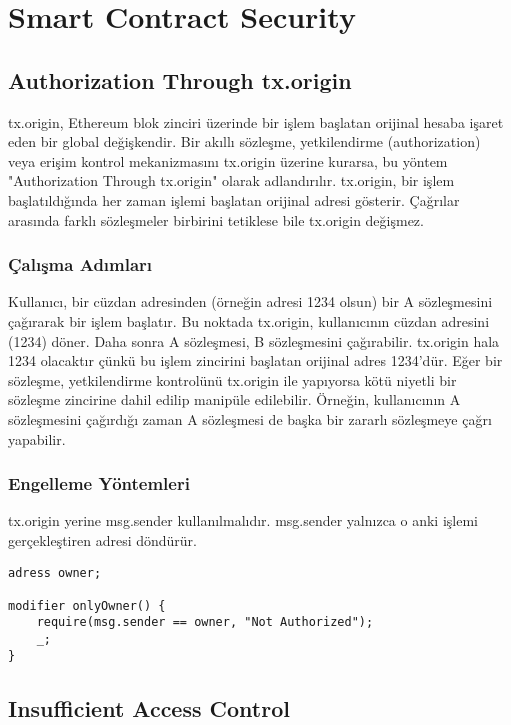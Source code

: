 \section{Smart Contract Security}

\subsection{Authorization Through tx.origin}

tx.origin, Ethereum blok zinciri üzerinde bir işlem başlatan orijinal hesaba işaret eden bir global değişkendir. Bir akıllı sözleşme, yetkilendirme (authorization) veya erişim kontrol mekanizmasını tx.origin üzerine kurarsa, bu yöntem "Authorization Through tx.origin" olarak adlandırılır.  tx.origin, bir işlem başlatıldığında her zaman işlemi başlatan orijinal adresi gösterir. Çağrılar arasında farklı sözleşmeler birbirini tetiklese bile tx.origin değişmez.

\subsubsection{Çalışma Adımları}

Kullanıcı, bir cüzdan adresinden (örneğin adresi 1234 olsun) bir A sözleşmesini çağırarak bir işlem başlatır. Bu noktada tx.origin, kullanıcının cüzdan adresini (1234) döner. Daha sonra A sözleşmesi, B sözleşmesini çağırabilir. tx.origin hala 1234 olacaktır çünkü bu işlem zincirini başlatan orijinal adres 1234'dür. Eğer bir sözleşme, yetkilendirme kontrolünü tx.origin ile yapıyorsa kötü niyetli bir sözleşme zincirine dahil edilip manipüle edilebilir. Örneğin, kullanıcının A sözleşmesini çağırdığı zaman A sözleşmesi de başka bir zararlı sözleşmeye çağrı yapabilir.

\subsubsection{Engelleme Yöntemleri}

tx.origin yerine msg.sender kullanılmalıdır. msg.sender yalnızca o anki işlemi gerçekleştiren adresi döndürür.

\begin{lstlisting}
adress owner;

modifier onlyOwner() {
    require(msg.sender == owner, "Not Authorized");
    _;
}
\end{lstlisting}

\newpage

\subsection{Insufficient Access Control}

